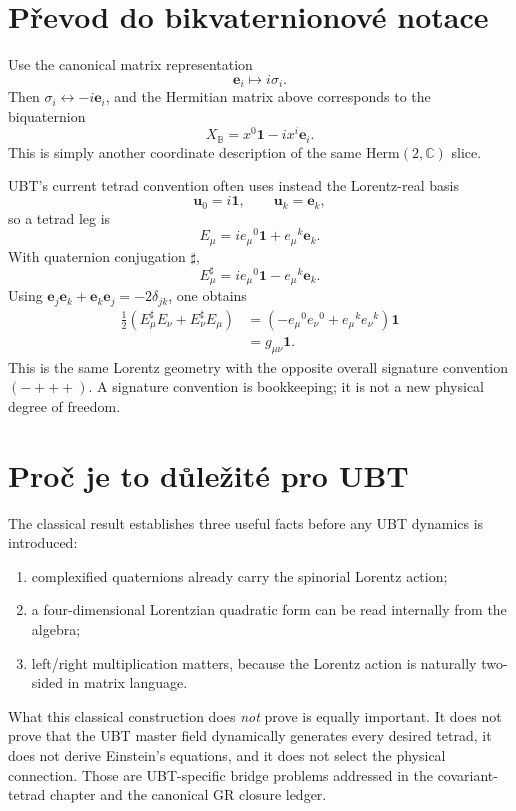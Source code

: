 \section{Převod do bikvaternionové notace}
Use the canonical matrix representation
\[
 \mathbf e_i\longmapsto i\sigma_i.
\]
Then $\sigma_i\leftrightarrow -i\mathbf e_i$, and the Hermitian matrix above
corresponds to the biquaternion
\[
 X_{\mathbb B}=x^0\mathbf1-i x^i\mathbf e_i.
\]
This is simply another coordinate description of the same
$\mathrm{Herm}(2,\mathbb C)$ slice.

UBT's current tetrad convention often uses instead the Lorentz-real basis
\[
 \mathbf u_0=i\mathbf1,
 \qquad \mathbf u_k=\mathbf e_k,
\]
so a tetrad leg is
\[
 E_\mu=i e_\mu{}^0\mathbf1+e_\mu{}^k\mathbf e_k.
\]
With quaternion conjugation $\sharp$,
\[
 E_\mu^\sharp=i e_\mu{}^0\mathbf1-e_\mu{}^k\mathbf e_k.
\]
Using $\mathbf e_j\mathbf e_k+\mathbf e_k\mathbf e_j=-2\delta_{jk}$,
one obtains
\begin{align*}
 \frac12(E_\mu^\sharp E_\nu+E_\nu^\sharp E_\mu)
 &=\left(-e_\mu{}^0e_\nu{}^0+e_\mu{}^k e_\nu{}^k\right)\mathbf1\\
 &=g_{\mu\nu}\mathbf1.
\end{align*}
This is the same Lorentz geometry with the opposite overall signature
convention $(-+++)$.  A signature convention is bookkeeping; it is not a new
physical degree of freedom.

\section{Proč je to důležité pro UBT}
The classical result establishes three useful facts before any UBT dynamics is
introduced:
\begin{enumerate}
 \item complexified quaternions already carry the spinorial Lorentz action;
 \item a four-dimensional Lorentzian quadratic form can be read internally from
       the algebra;
 \item left/right multiplication matters, because the Lorentz action is
       naturally two-sided in matrix language.
\end{enumerate}

What this classical construction does \emph{not} prove is equally important.
It does not prove that the UBT master field dynamically generates every desired
tetrad, it does not derive Einstein's equations, and it does not select the
physical connection.  Those are UBT-specific bridge problems addressed in the
covariant-tetrad chapter and the canonical GR closure ledger.

